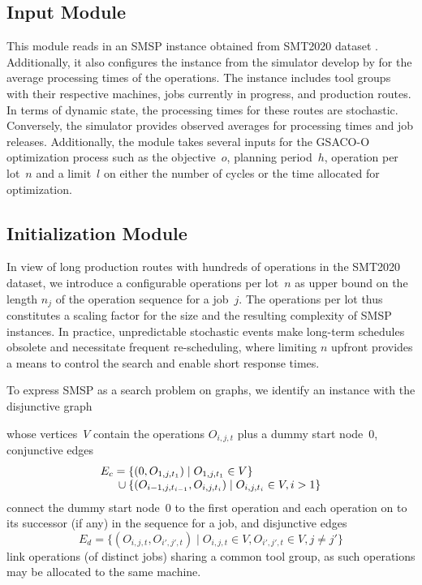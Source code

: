 \subsection{Input Module}
This module reads in an SMSP instance obtained from SMT2020 dataset \cite{kopp2020smt2020}. Additionally, it also configures the instance from the simulator develop by \cite{Kovacs2022} for the average processing times of the operations. 
The instance includes tool groups with their respective machines, jobs currently in progress, and production routes. In terms of dynamic state, the processing times for these routes are stochastic. Conversely, the simulator provides observed averages for processing times and job releases. Additionally, the module takes several inputs for the GSACO-O optimization process such as the objective~$o$, planning period~$h$, 
operation per lot~$n$ and a limit~$l$ on either the number of cycles or the time allocated for optimization.

\subsection{Initialization Module}
\label{subsec:initialization}
In view of long production routes with hundreds of operations
in the SMT2020 dataset, we introduce a configurable operations per lot~$n$
as upper bound on the length $n_j$ of the operation sequence for a job~$j$.
The operations per lot thus constitutes a scaling factor for the size and
the resulting complexity of SMSP instances.
In practice, unpredictable stochastic events make long-term schedules obsolete and necessitate frequent re-scheduling,
where limiting $n$ upfront provides a means to
control the search and enable short response times.

To express SMSP as a search problem on graphs,
we identify an instance with the disjunctive graph

whose vertices~$V$ contain the operations $O_{i,j,t}$ plus
a dummy start node~$0$,
conjunctive edges\linebreak[1]%
%
\begin{equation}
	\begin{array}{@{}r@{}l@{}}
		E_c = {}
		& \{(0,O_{1,j,t_1}) \mid O_{1,j,t_1}\in V\}
		\\ {} \cup {}
		& \{(O_{i-1,j,t_{i-1}},O_{i,j,t_i}) \mid O_{i,j,t_i}\in V, i > 1\}
	\end{array}
\end{equation}
%
connect the dummy start node~$0$ to the first operation
and each operation on to its successor (if any) in the sequence for a job,
and disjunctive edges\linebreak[1]%
%
\begin{equation}
	E_d = \{(O_{i,j,t},O_{i',j',t}) \mid O_{i,j,t}\in V,O_{i',j',t}\in V, j\neq j'\}
\end{equation}
%
link operations (of distinct jobs) sharing a common tool group,
as such operations may be allocated to the same machine.

